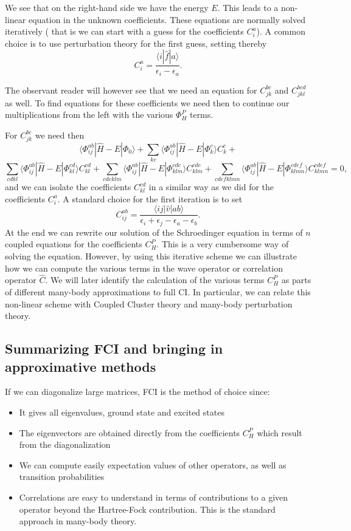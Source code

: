 We see that on the right-hand side we have the energy $E$. This leads to a non-linear equation in the unknown coefficients. 
These equations are normally solved iteratively ( that is we can start with a guess for the coefficients $C_i^a$). A common choice is to use perturbation theory for the first guess, setting thereby
\[
 C_{i}^{a}=\frac{\langle i | \hat{f}| a\rangle}{\epsilon_i-\epsilon_a}.
\]

The observant reader will however see that we need an equation for $C_{jk}^{bc}$ and $C_{jkl}^{bcd}$ as well.
To find equations for these coefficients we need then to continue our multiplications from the left with the various
$\Phi_{H}^P$ terms. 


For $C_{jk}^{bc}$ we need then
\[
\langle \Phi_{ij}^{ab} | \hat{H} -E| \Phi_0\rangle + \sum_{kc}\langle \Phi_{ij}^{ab} | \hat{H} -E|\Phi_{k}^{c} \rangle C_{k}^{c}+
\]
\[
\sum_{cdkl}\langle \Phi_{ij}^{ab} | \hat{H} -E|\Phi_{kl}^{cd} \rangle C_{kl}^{cd}+\sum_{cdeklm}\langle \Phi_{ij}^{ab} | \hat{H} -E|\Phi_{klm}^{cde} \rangle C_{klm}^{cde}+\sum_{cdefklmn}\langle \Phi_{ij}^{ab} | \hat{H} -E|\Phi_{klmn}^{cdef} \rangle C_{klmn}^{cdef}=0,
\]
and we can isolate the coefficients $C_{kl}^{cd}$ in a similar way as we did for the coefficients $C_{i}^{a}$. 
A standard choice for the first iteration is to set 
\[
C_{ij}^{ab} =\frac{\langle ij \vert \hat{v} \vert ab \rangle}{\epsilon_i+\epsilon_j-\epsilon_a-\epsilon_b}.
\]
At the end we can rewrite our solution of the Schroedinger equation in terms of $n$ coupled equations for the coefficients $C_H^P$.
This is a very cumbersome way of solving the equation. However, by using this iterative scheme we can illustrate how we can compute the
various terms in the wave operator or correlation operator $\hat{C}$. We will later identify the calculation of the various terms $C_H^P$
as parts of different many-body approximations to full CI. In particular, we can  relate this non-linear scheme with Coupled Cluster theory and
many-body perturbation theory.


\subsection{Summarizing FCI and bringing in approximative methods}


If we can diagonalize large matrices, FCI is the method of choice since:
\begin{itemize}
\item It gives all eigenvalues, ground state and excited states

\item The eigenvectors are obtained directly from the coefficients $C_H^P$ which result from the diagonalization

\item We can compute easily expectation values of other operators, as well as transition probabilities

\item Correlations are easy to understand in terms of contributions to a given operator beyond the Hartree-Fock contribution. This is the standard approach in  many-body theory. 
\end{itemize}

